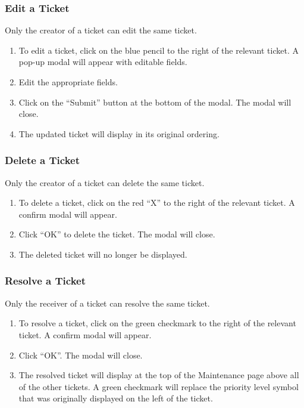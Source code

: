 \documentclass[12pt]{article}
\begin{document}
    \subsubsection{Edit a Ticket}
    Only the creator of a ticket can edit the same ticket.
    \begin{enumerate}
        \item To edit a ticket, click on the blue pencil to the right of the relevant ticket. A pop-up modal will appear with editable fields.
        \item Edit the appropriate fields.
        \item Click on the ``Submit'' button at the bottom of the modal. The modal will close.
        \item The updated ticket will display in its original ordering.
    \end{enumerate}

    \subsubsection{Delete a Ticket}
    Only the creator of a ticket can delete the same ticket.
    \begin{enumerate}
        \item To delete a ticket, click on the red ``X'' to the right of the relevant ticket. A confirm modal will appear.
        \item Click ``OK'' to delete the ticket. The modal will close.
        \item The deleted ticket will no longer be displayed.
    \end{enumerate}

    \subsubsection{Resolve a Ticket}
    Only the receiver of a ticket can resolve the same ticket.
    \begin{enumerate}
        \item To resolve a ticket, click on the green checkmark to the right of the relevant ticket. A confirm modal will appear.
        \item Click ``OK''. The modal will close.
        \item The resolved ticket will display at the top of the Maintenance page above all of the other tickets. A green checkmark will replace the priority level symbol that was originally displayed on the left of the ticket.
    \end{enumerate}
\end{document}
